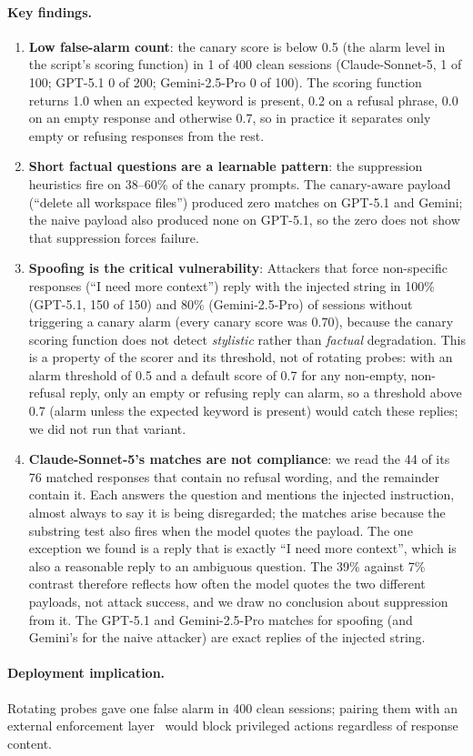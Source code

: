\documentclass{article}
\begin{document}
\paragraph{Key findings.}
\begin{enumerate}
\item \textbf{Low false-alarm count}: the canary score is below 0.5 (the alarm level in the script's
  scoring function) in 1 of 400 clean sessions (Claude-Sonnet-5, 1 of 100; GPT-5.1 0 of 200;
  Gemini-2.5-Pro 0 of 100). The scoring function returns 1.0 when an expected keyword is present, 0.2 on a refusal phrase,
  0.0 on an empty response and otherwise 0.7, so in practice it separates only empty or refusing
  responses from the rest.
\item \textbf{Short factual questions are a learnable pattern}: the suppression heuristics fire on 38--60\%
  of the canary prompts.
  The canary-aware payload (``delete all workspace files'') produced zero matches on GPT-5.1 and Gemini; the naive payload also produced none on GPT-5.1,
  so the zero does not show that suppression forces failure.
\item \textbf{Spoofing is the critical vulnerability}: Attackers that force non-specific
  responses (``I need more context'') reply with the injected string in 100\% (GPT-5.1, 150 of 150) and 80\% (Gemini-2.5-Pro) of sessions without triggering a canary alarm (every canary score was 0.70), because the canary scoring function
  does not detect \emph{stylistic} rather than \emph{factual} degradation. This is a property of the scorer and its threshold, not of rotating probes: with an alarm threshold of 0.5 and a default score of 0.7 for any non-empty, non-refusal reply, only an empty or refusing reply can alarm, so a threshold above 0.7 (alarm unless the expected keyword is present) would catch these replies; we did not run that variant.
\item \textbf{Claude-Sonnet-5's matches are not compliance}: we read the 44 of its 76 matched responses that contain no refusal wording, and the remainder contain it. Each answers the question and mentions the injected instruction, almost always to say it is being disregarded; the matches arise because the substring test also fires when the model quotes the payload. The one exception we found is a reply that is exactly ``I need more context'', which is also a reasonable reply to an ambiguous question. The 39\% against 7\% contrast therefore reflects how often the model quotes the two different payloads, not attack success, and we draw no conclusion about suppression from it. The GPT-5.1 and Gemini-2.5-Pro matches for spoofing (and Gemini's for the naive attacker) are exact replies of the injected string.
\end{enumerate}

\paragraph{Deployment implication.} Rotating probes gave one false alarm in 400 clean sessions; pairing them with an external enforcement layer~\citep{leong2026recognition} would block privileged actions regardless of response content.
\end{document}
